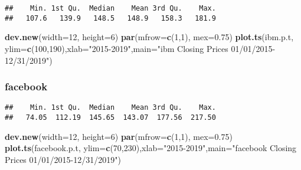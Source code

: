 \documentclass[]{article}
\newenvironment{Shaded}{\begin{snugshade}}{\end{snugshade}}
\newcommand{\KeywordTok}[1]{\textcolor[rgb]{0.13,0.29,0.53}{\textbf{#1}}}
\newcommand{\DataTypeTok}[1]{\textcolor[rgb]{0.13,0.29,0.53}{#1}}
\newcommand{\DecValTok}[1]{\textcolor[rgb]{0.00,0.00,0.81}{#1}}
\newcommand{\FloatTok}[1]{\textcolor[rgb]{0.00,0.00,0.81}{#1}}
\newcommand{\StringTok}[1]{\textcolor[rgb]{0.31,0.60,0.02}{#1}}
\newcommand{\OperatorTok}[1]{\textcolor[rgb]{0.81,0.36,0.00}{\textbf{#1}}}
\newcommand{\NormalTok}[1]{#1}
\begin{document}
\begin{verbatim}
##    Min. 1st Qu.  Median    Mean 3rd Qu.    Max. 
##   107.6   139.9   148.5   148.9   158.3   181.9
\end{verbatim}

\begin{Shaded}
\begin{Highlighting}[]
\KeywordTok{dev.new}\NormalTok{(}\DataTypeTok{width=}\DecValTok{12}\NormalTok{, }\DataTypeTok{height=}\DecValTok{6}\NormalTok{)}
\KeywordTok{par}\NormalTok{(}\DataTypeTok{mfrow=}\KeywordTok{c}\NormalTok{(}\DecValTok{1}\NormalTok{,}\DecValTok{1}\NormalTok{), }\DataTypeTok{mex=}\FloatTok{0.75}\NormalTok{)}
\KeywordTok{plot.ts}\NormalTok{(ibm.p.t, }\DataTypeTok{ylim=}\KeywordTok{c}\NormalTok{(}\DecValTok{100}\NormalTok{,}\DecValTok{190}\NormalTok{),}\DataTypeTok{xlab=}\StringTok{"2015-2019"}\NormalTok{,}\DataTypeTok{main=}\StringTok{"ibm Closing Prices 01/01/2015-12/31/2019"}\NormalTok{)}
\end{Highlighting}
\end{Shaded}

\subsubsection{facebook}\label{facebook}

\begin{Shaded}
\end{Shaded}

\begin{verbatim}
##    Min. 1st Qu.  Median    Mean 3rd Qu.    Max. 
##   74.05  112.19  145.65  143.07  177.56  217.50
\end{verbatim}

\begin{Shaded}
\begin{Highlighting}[]
\KeywordTok{dev.new}\NormalTok{(}\DataTypeTok{width=}\DecValTok{12}\NormalTok{, }\DataTypeTok{height=}\DecValTok{6}\NormalTok{)}
\KeywordTok{par}\NormalTok{(}\DataTypeTok{mfrow=}\KeywordTok{c}\NormalTok{(}\DecValTok{1}\NormalTok{,}\DecValTok{1}\NormalTok{), }\DataTypeTok{mex=}\FloatTok{0.75}\NormalTok{)}
\KeywordTok{plot.ts}\NormalTok{(facebook.p.t, }\DataTypeTok{ylim=}\KeywordTok{c}\NormalTok{(}\DecValTok{70}\NormalTok{,}\DecValTok{230}\NormalTok{),}\DataTypeTok{xlab=}\StringTok{"2015-2019"}\NormalTok{,}\DataTypeTok{main=}\StringTok{"facebook Closing Prices 01/01/2015-12/31/2019"}\NormalTok{)}
\end{Highlighting}
\end{Shaded}
\end{document}
